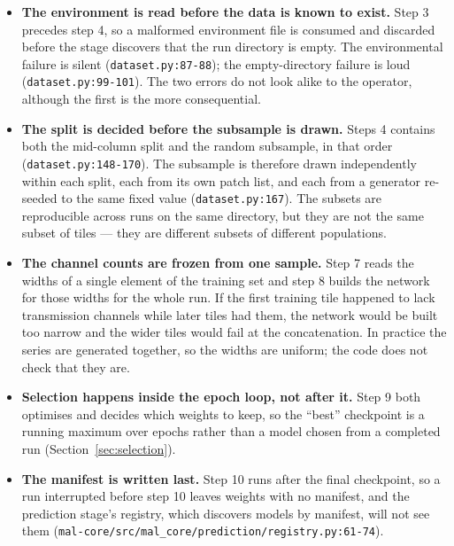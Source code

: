 \documentclass[11pt,a4paper]{article}
\newcommand{\codex}[1]{\texttt{#1}}
\begin{document}
\begin{itemize}
\item \textbf{The environment is read before the data is known to exist.}
      Step 3 precedes step 4, so a malformed environment file is consumed
      and discarded before the stage discovers that the run directory is
      empty. The environmental failure is silent
      (\codex{dataset.py:87-88}); the empty-directory failure is loud
      (\codex{dataset.py:99-101}). The two errors do not look alike to the
      operator, although the first is the more consequential.
\item \textbf{The split is decided before the subsample is drawn.} Steps 4
      contains both the mid-column split and the random subsample, in that
      order (\codex{dataset.py:148-170}). The subsample is therefore drawn
      independently within each split, each from its own patch list, and each
      from a generator re-seeded to the same fixed value
      (\codex{dataset.py:167}). The subsets are reproducible across runs on
      the same directory, but they are not the same subset of tiles --- they
      are different subsets of different populations.
\item \textbf{The channel counts are frozen from one sample.} Step 7 reads
      the widths of a single element of the training set and step 8 builds
      the network for those widths for the whole run. If the first training
      tile happened to lack transmission channels while later tiles had them,
      the network would be built too narrow and the wider tiles would fail at
      the concatenation. In practice the series are generated together, so
      the widths are uniform; the code does not check that they are.
\item \textbf{Selection happens inside the epoch loop, not after it.} Step 9
      both optimises and decides which weights to keep, so the ``best''
      checkpoint is a running maximum over epochs rather than a model chosen
      from a completed run (Section~\ref{sec:selection}).
\item \textbf{The manifest is written last.} Step 10 runs after the final
      checkpoint, so a run interrupted before step 10 leaves weights with no
      manifest, and the prediction stage's registry, which discovers models
      by manifest, will not see them
      (\codex{mal-core/\allowbreak{}src/\allowbreak{}mal\_\allowbreak{}core/\allowbreak{}prediction/\allowbreak{}registry.py:61-74}).
\end{itemize}
\end{document}
